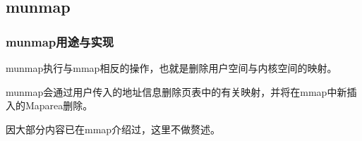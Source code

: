 \subsection{munmap}

\subsubsection{munmap用途与实现}
munmap执行与mmap相反的操作，也就是删除用户空间与内核空间的映射。

munmap会通过用户传入的地址信息删除页表中的有关映射，并将在mmap中新插入的Maparea删除。

因大部分内容已在mmap介绍过，这里不做赘述。